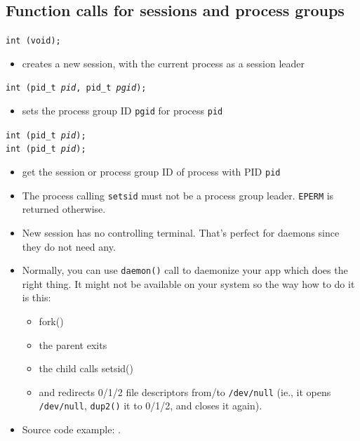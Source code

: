 \subsection{Function calls for sessions and process groups}

\texttt{int (void);}
\begin{itemize}
\item creates a new session, with the current process as a session leader
\end{itemize}
\texttt{int (pid\_t \emph{pid}, pid\_t \emph{pgid});}
\begin{itemize}
\item sets the process group ID \texttt{pgid} for process \texttt{pid}
\end{itemize}
\texttt{int (pid\_t \emph{pid});}\\
\texttt{int (pid\_t \emph{pid});}
\begin{itemize}
\item get the session or process group ID of process with PID \texttt{pid}
\end{itemize}

\begin{itemize}
\item \label{SETSID} The process calling \texttt{setsid} must not be a process
group leader. \texttt{EPERM} is returned otherwise.
\item New session has no controlling terminal. That's perfect for daemons since
they do not need any.
\item Normally, you can use \texttt{daemon()} call to daemonize your app which
does the right thing. It might not be available on your system so the way how to
do it is this:
	\begin{itemize}
	\item fork()
	\item the parent exits
	\item the child calls setsid()
	\item and redirects 0/1/2 file descriptors from/to \texttt{/dev/null}
	(ie., it opens \texttt{/dev/null}, \texttt{dup2()} it to 0/1/2, and
	closes it again).
	\end{itemize}
\item Source code example: .
\end{itemize}

